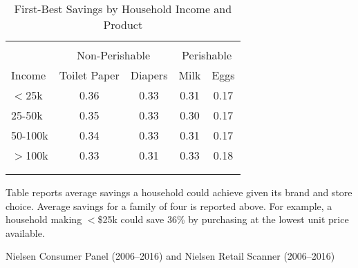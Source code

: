 \begin{table}[!htbp] \centering
\caption{First-Best Savings by Household Income and Product}
\label{tab:excessSpending}
\begin{tabular}{lcccc}
\\[-1.8ex]\hline
\hline \\[-1.8ex]
            & \multicolumn{2}{c}{Non-Perishable} & \multicolumn{2}{c}{Perishable} \\
              \cline{2-3}                             \cline{4-5}
Income      & Toilet Paper  & Diapers & Milk  & Eggs \\
\hline
$<$25k      & 0.36          & 0.33    & 0.31  & 0.17 \\
25-50k    & 0.35          & 0.33    & 0.30  & 0.17 \\
50-100k   & 0.34          & 0.33    & 0.31  & 0.17 \\
$>$100k     & 0.33          & 0.31    & 0.33  & 0.18  \\
\\[-1.8ex]\hline
\hline \\[-1.8ex]
\end{tabular}
\begin{tablenotes}
Table reports average savings a household could achieve given its brand and store choice. Average savings for a family of four is reported above. For example, a household making $<$\$25k could save 36\% by purchasing at the lowest unit price available.
\end{tablenotes}
\begin{tablenotes}[Source]
Nielsen Consumer Panel (2006--2016) and Nielsen Retail Scanner (2006--2016)
\end{tablenotes}
\end{table}
